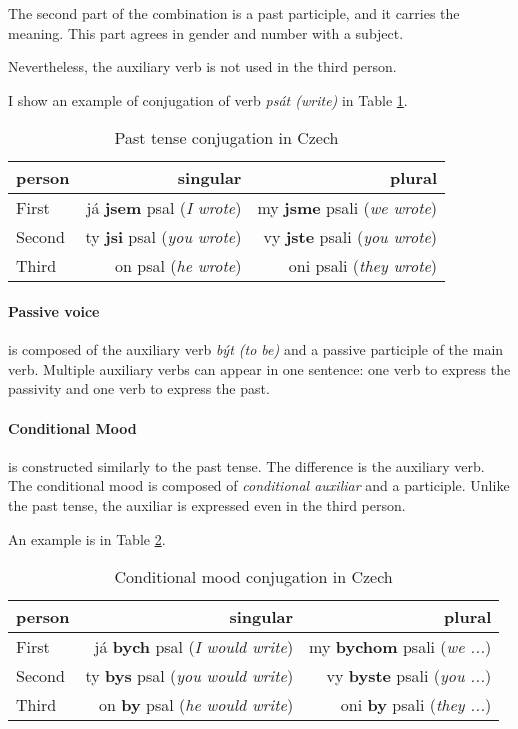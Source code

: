 The second part of the combination is a past participle, and it carries the meaning. This part agrees in gender and number with a subject.

Nevertheless, the auxiliary verb is not used in the third person.

I show an example of conjugation of verb \emph{psát (write)} in Table \ref{tab:past-tense-conj}.

\begin{table}[!ht]
	\caption{Past tense conjugation in Czech}
	\label{tab:past-tense-conj}
	\begin{center}
		\begin{tabular}{l|r|r}
			person & singular & plural \\
			\hline
			First & já \textbf{jsem} psal (\emph{I wrote}) & my \textbf{jsme} psali (\emph{we wrote}) \\
			Second & ty \textbf{jsi} psal (\emph{you wrote}) & vy \textbf{jste} psali (\emph{you wrote})  \\
			Third & on psal (\emph{he wrote}) & oni psali (\emph{they wrote})  \\
		\end{tabular}
	\end{center}
\end{table}

\paragraph{Passive voice} is composed of the auxiliary verb \emph{být (to be)} and a passive participle of the main verb. Multiple auxiliary verbs can appear in one sentence: one verb to express the passivity and one verb to express the past.

\paragraph{Conditional Mood} is constructed similarly to the past tense. The difference is the auxiliary verb. The conditional mood is composed of \emph{conditional auxiliar} and a participle. Unlike the past tense, the auxiliar is expressed even in the third person.

An example is in Table \ref{tab:cond}.

\begin{table}[!ht]
	\caption{Conditional mood conjugation in Czech}
	\label{tab:cond}
	\begin{center}
		\begin{tabular}{l|r|r}
			person & singular & plural \\
			\hline
			First & já \textbf{bych} psal (\emph{I would write}) & my \textbf{bychom} psali (\emph{we ...}) \\
			Second & ty \textbf{bys} psal (\emph{you would write}) & vy \textbf{byste} psali (\emph{you ...})  \\
			Third & on \textbf{by} psal (\emph{he would write}) & oni \textbf{by} psali (\emph{they ...})  \\
		\end{tabular}
	\end{center}
\end{table}

